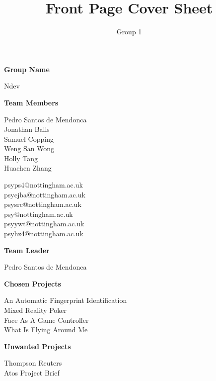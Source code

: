 \documentclass[11pt, oneside]{article}
\title{Front Page Cover Sheet}
\author{Group 1}
\begin{document}
\maketitle

\vspace{1cm}

\begin{minipage}[t]{0.25\textwidth}
    \textbf{Group Name}
\end{minipage}
\begin{minipage}[t]{0.35\textwidth}
    Ndev
\end{minipage}


\vspace{0.3cm}

\begin{minipage}[t]{0.25\textwidth}
\textbf{Team Members}\\
\end{minipage}
\begin{minipage}[t]{0.35\textwidth}
    Pedro Santos de Mendonca\\
    Jonathan Balls\\
    Samuel Copping\\
    Weng San Wong\\
    Holly Tang\\
    Huachen Zhang\\
\end{minipage}
\begin{minipage}[t]{0.35\textwidth}
    psyps4@nottingham.ac.uk \\
    psycjba@nottingham.ac.uk \\
    psysrc@nottingham.ac.uk \\
    psy@nottingham.ac.uk \\
    psyywt@nottingham.ac.uk \\
    psyhz4@nottingham.ac.uk \\
\end{minipage}

\vspace{0.3cm}

\begin{minipage}[t]{0.25\textwidth}
    \textbf{Team Leader}
\end{minipage}
\begin{minipage}[t]{0.35\textwidth}
    Pedro Santos de Mendonca
\end{minipage}

\vspace{0.3cm}

\begin{minipage}[t]{0.25\textwidth}
    \textbf{Chosen Projects}
\end{minipage}
\begin{minipage}[t]{0.5\textwidth}
    An Automatic Fingerprint Identification\\
    Mixed Reality Poker\\
    Face As A Game Controller\\
    What Is Flying Around Me\\
\end{minipage}

\begin{minipage}[t]{0.25\textwidth}
    \textbf{Unwanted Projects}
\end{minipage}
\begin{minipage}[t]{0.5\textwidth}
    Thompson Reuters\\
    Atos Project Brief\\
\end{minipage}
\end{document}

